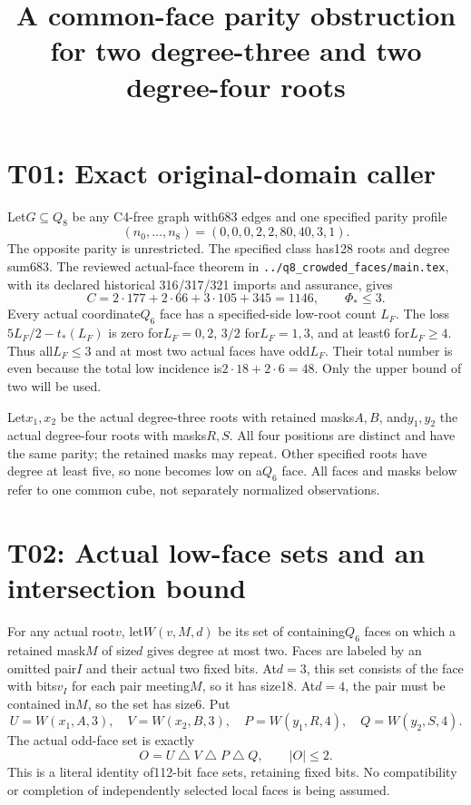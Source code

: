 \documentclass{article}
\begin{document}
\title{A common-face parity obstruction for two degree-three and two degree-four roots}
\maketitle
\section{T01: Exact original-domain caller}
Let$G\subseteq Q_8$ be any C4-free graph with683 edges and one
specified parity profile
\[
           (n_0,\ldots,n_8)=(0,0,0,2,2,80,40,3,1).       \tag{1}
\]
The opposite parity is unrestricted. The specified class has128 roots
and degree sum683. The reviewed actual-face theorem in
\texttt{../q8\_crowded\_faces/main.tex}, with its declared historical
316/317/321 imports and assurance, gives
\[
 C=2\cdot177+2\cdot66+3\cdot105+345=1146,
 \qquad\Phi_*\le3.                                    \tag{2}
\]
Every actual coordinate$Q_6$ face has a specified-side low-root count
$L_F$. The loss$5L_F/2-t_*(L_F)$ is zero for$L_F=0,2$,
$3/2$ for$L_F=1,3$, and at least6 for$L_F\ge4$. Thus all$L_F\le3$
and at most two actual faces have odd$L_F$. Their total number is even
because the total low incidence is$2\cdot18+2\cdot6=48$.
Only the upper bound of two will be used.

Let$x_1,x_2$ be the actual degree-three roots with retained masks$A,B$,
and$y_1,y_2$ the actual degree-four roots with masks$R,S$.
All four positions are distinct and have the same parity; the retained
masks may repeat. Other specified roots have degree at least five,
so none becomes low on a$Q_6$ face. All faces and masks below refer to
one common cube, not separately normalized observations.

\section{T02: Actual low-face sets and an intersection bound}
For any actual root$v$, let$W(v,M,d)$ be its set of containing$Q_6$
faces on which a retained mask$M$ of size$d$ gives degree at most two.
Faces are labeled by an omitted pair$I$ and their actual two fixed bits.
At$d=3$, this set consists of the face with bits$v_I$ for each pair
meeting$M$, so it has size18. At$d=4$, the pair must be contained in$M$,
so the set has size6. Put
\[
 U=W(x_1,A,3),\quad V=W(x_2,B,3),\quad
 P=W(y_1,R,4),\quad Q=W(y_2,S,4).
\]
The actual odd-face set is exactly
\[
                       O=U\mathbin\triangle V
                           \mathbin\triangle P\mathbin\triangle Q,
               \qquad |O|\le2.                         \tag{3}
\]
This is a literal identity of112-bit face sets, retaining fixed bits.
No compatibility or completion of independently selected local faces
is being assumed.
\end{document}
